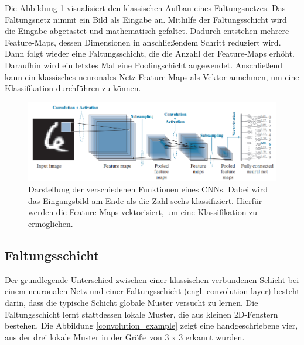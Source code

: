 Die Abbildung \ref{cnn_arch} visualisiert den klassischen Aufbau eines Faltungsnetzes. Das Faltungsnetz nimmt ein Bild als Eingabe an. Mithilfe der Faltungsschicht wird die Eingabe abgetastet und mathematisch gefaltet. Dadurch entstehen mehrere Feature-Maps, dessen Dimensionen in anschließendem Schritt reduziert wird. Dann folgt wieder eine Faltungsschicht, die die Anzahl der Feature-Maps erhöht. Daraufhin wird ein letztes Mal eine Poolingschicht angewendet. Anschließend kann ein klassisches neuronales Netz Feature-Maps als Vektor annehmen, um eine Klassifikation durchführen zu können\cite{Gonzalez2018}.

\begin{figure}[h!]
	\centering
	\includegraphics[width=\textwidth]{bilder/cnn_arch.PNG}
	\caption{Darstellung der verschiedenen Funktionen eines CNNs. Dabei wird das Eingangsbild am Ende als die Zahl sechs klassifiziert. Hierfür werden die Feature-Maps vektorisiert, um eine Klassifikation zu ermöglichen\cite{Gonzalez2018}.}
	\label{cnn_arch}
\end{figure}

\subsection{Faltungsschicht}
\label{sec:faltungsschicht}


Der grundlegende Unterschied zwischen einer klassischen verbundenen Schicht bei einem neuronalen Netz und einer Faltungsschicht (engl. convolution layer) besteht darin, dass die typische Schicht globale Muster versucht zu lernen. Die Faltungsschicht lernt stattdessen lokale Muster, die aus kleinen 2D-Fenstern bestehen. Die Abbildung \ref{convolution_example} zeigt eine handgeschriebene vier, aus der drei lokale Muster in der Größe von 3 x 3 erkannt wurden\cite{francois}.

